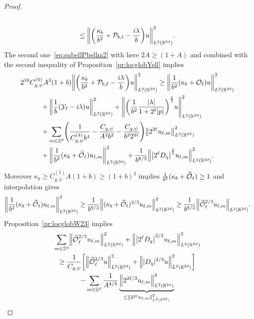 \documentclass[10pt]{amsart}
\theoremstyle{definition}\newtheorem{defi}[theo]{Definition}\newtheorem{rema}[theo]{Remark}\newtheorem{exam}[theo]{Example}\newtheorem{exem}[theo]{Example}\newtheorem{nota}[theo]{Notation}
\newcommand{\Z}{\mathbb{Z}}
\newcommand{\R}{\mathbb{R}}
\newcommand{\clY}{\mathcal{Y}}
\newcommand{\clO}{\mathcal{O}}
\newcommand{\clP}{\mathcal{P}}
\let\oldtilde\tilde
\renewcommand*{\tilde}[1]{\mathchoice{\widetilde{#1}}{\widetilde{#1}}{\oldtilde{#1}}{\oldtilde{#1}}}
\let\originalleft\left
\let\originalright\right
\renewcommand{\left}{\mathopen{}\mathclose\bgroup\originalleft}
\renewcommand{\right}{\aftergroup\egroup\originalright}
\begin{document}
\begin{proof}
\begin{multline*}
\\\leq
\left\| \left(\frac{\kappa_{b}}{b^{2}}+\clP_{b,\ell} - \frac{i\lambda}{b}\right) u \right\|^{2}_{L^2(\R^{2d})}.
\end{multline*}
The second one~\eqref{eq:subellPbellm2} with here $2A\geq (1+A)$ and combined with the second inequality of Proposition~\ref{pr:locglobYell} implies
\begin{multline*}
2^{10}C_{g,\psi}^{(4)}A^{3}(1+b)\left\| \left(\frac{\kappa_{b}}{b^{2}}+\clP_{b,\ell} - \frac{i\lambda}{b}\right) u \right\|^{2}_{L^2(\R^{2d})}
\geq\left\|\frac{1}{b^{2}}(\kappa_{b}+\clO_{\ell})u\right\|_{L^{2}(\R^{2d})}^{2}\\
\begin{aligned}
&+\left\|\frac{1}{b}(\clY_{\ell}-i\lambda)u\right\|_{L^{2}(\R^{2d})}^{2} +\left\| \left(\frac{1}{b^2} \frac{|\lambda|}{1+2^{\ell}|p|} \right)^{\frac{2}{3}} u \right\|_{L^2(\R^{2d})}^{2}
\\ &+\sum_{m\in\Z^{d}}\left(\frac{1}{C^{(4)}_{g,\psi}b^{4}}-\frac{C_{g,\psi}}{A^{2}b^{2}}-\frac{C_{g,\psi}}{b^{2}2^{2\ell}}\right)
\left\|2^{2\ell}u_{\ell,m}\right\|_{L^{2}(\R^{2d})}^{2}
\\
&+
\left\|\frac{1}{b^{2}}(\kappa_{b}+\tilde{\clO}_{\ell}) u_{\ell,m}\right\|_{L^2(\R^{2d})}^2+ \frac{1}{b^{8/3}}\left\|\left|2^{\ell}D_{q} \right|^{\frac{2}{3}} u_{\ell,m} \right\|_{L^2(\R^{2d})}^{2}.
\end{aligned}
\end{multline*}
Moreover $\kappa_{b}\geq C^{(5)}_{g,\psi}A(1+b)\geq (1+b)^{2}$ implies $\frac{1}{b^{2}}(\kappa_{b}+\tilde{\clO}_{\ell})\geq 1$ and interpolation gives
\[
\left\|\frac{1}{b^{2}}(\kappa_{b}+\tilde{\clO}_{\ell}) u_{\ell,m}\right\|_{L^2(\R^{2d})}^2\geq \frac{1}{b^{8/3}}\left\|(\kappa_b+\tilde{\clO}_{\ell})^{2/3} u_{\ell,m}\right\|_{L^2(\R^{2d})}^2\geq \frac{1}{b^{8/3}}\left\|\tilde{\clO}_{\ell}^{2/3}u_{\ell,m}\right\|_{L^2(\R^{2d})}.
\]
Proposition~\ref{pr:locglobW23} implies
\begin{multline*}
\sum_{m\in\Z^{d}}\left\|\tilde{\clO}_{\ell}^{2/3}u_{\ell,m}\right\|_{L^{2}(\R^{2d})}^{2}+
\left\|\left|2^{\ell}D_{q}\right|^{2/3}u_{\ell,m}\right\|_{L^{2}(\R^{2d})}^{2}
\\
\geq
\frac{1}{C_{g,\psi}}\left[
\left\|\tilde{\clO}_{\ell}^{2/3}u\right\|_{L^{2}(\R^{2d})}^{2}+
\left\||D_{q}|^{2/3}u\right\|_{L^{2}(\R^{2d})}^{2}
\right]\\
-\sum_{m\in\Z^{d}}\frac{1}{A^{4/3}}
\underbrace{\left\|2^{2\ell/3}u_{\ell,m}\right\|_{L^{2}(\R^{2d})}^{2}}_{\leq \left\|2^{2\ell}u_{\ell,m}\right\|_{L^{2}(\R^{2d})}^{2}}

\end{multline*}
\end{proof}
\end{document}
